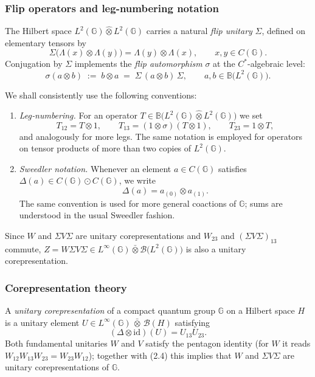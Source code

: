 \documentclass[12pt, reqno]{amsart}
\theoremstyle{definition}
\theoremstyle{remark}
\numberwithin{equation}{section}
\begin{document}
\subsubsection{Flip operators and leg-numbering notation}
\label{subsubsec:flips_notation}

The Hilbert space $L^{2}(\mathbb{G})\hat{\otimes}L^{2}(\mathbb{G})$ carries 
a natural \emph{flip unitary} $\Sigma$, defined on elementary tensors by
\[
\Sigma\bigl(\Lambda(x)\otimes\Lambda(y)\bigr) = \Lambda(y)\otimes\Lambda(x), 
\qquad x,y\in C(\mathbb{G}).
\]
Conjugation by $\Sigma$ implements the \emph{flip automorphism} $\sigma$ 
at the $C^{*}$-algebraic level:
\[
\sigma(a\otimes b) \;:=\; b\otimes a 
\;=\; \Sigma\,(a\otimes b)\,\Sigma, 
\qquad a,b\in\mathbb{B}\bigl(L^{2}(\mathbb{G})\bigr).
\]

We shall consistently use the following conventions:
\begin{enumerate}
    \item \emph{Leg‑numbering.} For an operator 
    $T\in\mathbb{B}\bigl(L^{2}(\mathbb{G})\hat{\otimes}L^{2}(\mathbb{G})\bigr)$ 
    we set
    \[
    T_{12} = T\otimes 1,\qquad
    T_{13} = (1\otimes\sigma)(T\otimes 1),\qquad
    T_{23} = 1\otimes T,
    \]
    and analogously for more legs. The same notation is employed for operators 
    on tensor products of more than two copies of $L^{2}(\mathbb{G})$.
    
    \item \emph{Sweedler notation.} Whenever an element $a\in C(\mathbb{G})$ 
    satisfies $\Delta(a)\in C(\mathbb{G})\odot C(\mathbb{G})$, we write
    \[
    \Delta(a) = a_{(0)}\otimes a_{(1)}.
    \]
    The same convention is used for more general coactions of $\mathbb{G}$; 
    sums are understood in the usual Sweedler fashion.
\end{enumerate}

Since $W$ and $\Sigma V \Sigma$ are unitary corepresentations and $W_{23}$ 
and $(\Sigma V\Sigma)_{13}$ commute, 
$Z = W \Sigma V \Sigma \in L^{\infty}(\mathbb{G})\bar{\otimes} 
\mathcal{B}\bigl(L^{2}(\mathbb{G})\bigr)$ is also a unitary corepresentation.

\subsubsection{Corepresentation theory}
\label{subsubsec:corep_theory}

A \emph{unitary corepresentation} of a compact quantum group $\mathbb{G}$ 
on a Hilbert space $H$ is a unitary element 
$U\in L^{\infty}(\mathbb{G})\,\bar{\otimes}\,\mathcal{B}(H)$ satisfying
\begin{equation}
    (\Delta\otimes\mathrm{id})(U)=U_{13}U_{23}. \tag{2.4}
\end{equation}
Both fundamental unitaries $W$ and $V$ satisfy the pentagon identity 
(for $W$ it reads $W_{12}W_{13}W_{23}=W_{23}W_{12}$); together with (2.4) 
this implies that $W$ and $\Sigma V\Sigma$ are unitary corepresentations 
of $\mathbb{G}$.
\end{document}
